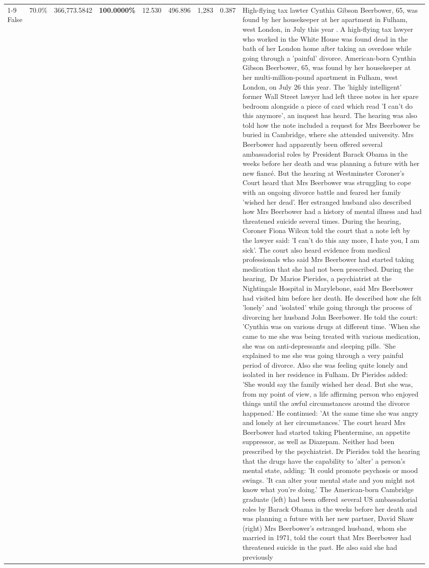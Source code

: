 \begin{table}[H]
\begin{tabular}{lllrlllll}
\cline{1-9}
False & 70.0\% & 366,773.5842 & \bfseries \color{red} 100.0000\% & 12.530 & 496.896 & 1,283 & 0.387 & High-flying tax lawter Cynthia Gibson Beerbower, 65, was found by her housekeeper at her apartment in Fulham, west London, in July this year . A high-flying tax lawyer who worked in the White House was found dead in the bath of her London home after taking an overdose while going through a 'painful' divorce. American-born Cynthia Gibson Beerbower, 65, was found by her housekeeper at her multi-million-pound apartment in Fulham, west London, on July 26 this year. The 'highly intelligent' former Wall Street lawyer had left three notes in her spare bedroom alongside a piece of card which read 'I can't do this anymore', an inquest has heard. The hearing was also told how the note included a request for Mrs Beerbower be buried in Cambridge, where she attended university. Mrs Beerbower had apparently been offered several ambassadorial roles by President Barack Obama in the weeks before her death and was planning a future with her new fiancé. But the hearing at Westminster Coroner's Court heard that Mrs Beerbower was struggling to cope with an ongoing divorce battle and feared her family 'wished her dead'. Her estranged husband also described how Mrs Beerbower had a history of mental illness and had threatened suicide several times. During the hearing, Coroner Fiona Wilcox told the court that a note left by the lawyer said: 'I can't do this any more, I hate you, I am sick'. The court also heard evidence from medical professionals who said Mrs Beerbower had started taking medication that she had not been prescribed. During the hearing, Dr Marios Pierides, a psychiatrist at the Nightingale Hospital in Marylebone, said Mrs Beerbower had visited him before her death. He described how she felt 'lonely' and 'isolated' while going through the process of divorcing her husband John Beerbower. He told the court: 'Cynthia was on various drugs at different time. 'When she came to me she was being treated with various medication, she was on anti-depressants and sleeping pills. 'She explained to me she was going through a very painful period of divorce. Also she was feeling quite lonely and isolated in her residence in Fulham. Dr Pierides added: 'She would say the family wished her dead. But she was, from my point of view, a life affirming person who enjoyed things until the awful circumstances around the divorce happened.' He continued: 'At the same time she was angry and lonely at her circumstances.' The court heard Mrs Beerbower had started taking Phentermine, an appetite suppressor, as well as Diazepam. Neither had been prescribed by the psychiatrist. Dr Pierides told the hearing that the drugs have the capability to 'alter' a person's mental state, adding: 'It could promote psychosis or mood swings. 'It can alter your mental state and you might not know what you're doing.' The American-born Cambridge graduate (left) had been offered several US ambassadorial roles by Barack Obama in the weeks before her death and was planning a future with her new partner, David Shaw (right) Mrs Beerbower's estranged husband, whom she married in 1971, told the court that Mrs Beerbower had threatened suicide in the past. He also said she had previously 
\end{tabular}
\end{table}
